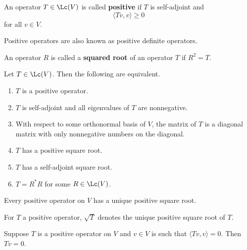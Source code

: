 \documentclass{extarticle}
\begin{document}
\begin{definition}
    An operator \(T \in \Lc(V)\) is called \textbf{positive} if \(T\) is self-adjoint and
    \[\langle Tv,v \rangle \geq 0\]
    for all \(v \in V\).
\end{definition}

\begin{remark}
    Positive operators are also known as positive definite operators.
\end{remark}

\begin{definition}
    An operator \(R\) is called a \textbf{squared root} of an operator \(T\) if \(R^2 = T\).
\end{definition}

\begin{thm}
    Let \(T \in \Lc(V)\). Then the following are equivalent.
    \begin{enumerate}[label=(\alph*)]
        \item \(T\) is a positive operator.
        \item \(T\) is self-adjoint and all eigenvalues of \(T\) are nonnegative.
        \item With respect to some orthonormal basis of \(V\), the matrix of \(T\) is a diagonal
        matrix with only nonnegative numbers on the diagonal.
        \item \(T\) has a positive square root.
        \item \(T\) has a self-adjoint square root.
        \item \(T = R^* R\) for some \(R \in \Lc(V)\).
    \end{enumerate}
\end{thm}

\begin{thm}
    Every positive operator on \(V\) has a unique positive square root.
\end{thm}

\begin{remark}
    For \(T\) a positive operator, \(\sqrt{T}\) denotes the unique positive square root of \(T\).
\end{remark}

\begin{corollary}
    Suppose \(T\) is a positive operator on \(V\) and \(v \in V\) is such that \(\langle Tv,v \rangle = 0\).
    Then \(Tv = 0\).
\end{corollary}
\end{document}
